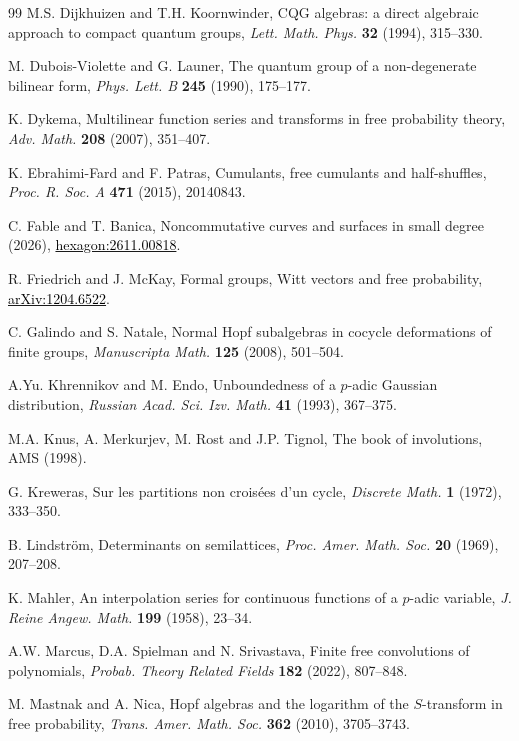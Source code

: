 \documentclass[11pt]{amsart}
\theoremstyle{definition}
\begin{document}
\begin{thebibliography}{99}
 M.S. Dijkhuizen and T.H. Koornwinder, CQG algebras: a direct algebraic approach to compact quantum groups, {\em Lett. Math. Phys.} {\bf 32} (1994), 315--330.

 M. Dubois-Violette and G. Launer, The quantum group of a non-degenerate bilinear form, {\em Phys. Lett. B} {\bf 245} (1990), 175--177.

 K. Dykema, Multilinear function series and transforms in free probability theory, {\em Adv. Math.} {\bf 208} (2007), 351--407.

 K. Ebrahimi-Fard and F. Patras, Cumulants, free cumulants and half-shuffles, {\em Proc. R. Soc. A} {\bf 471} (2015), 20140843.

 C. Fable and T. Banica, Noncommutative curves and surfaces in small degree (2026), \href{https://hexagonmath.org/2611.00818v1}{\textcolor{black}{\mbox{hexagon:2611.00818}}}.

 R. Friedrich and J. McKay, Formal groups, Witt vectors and free probability, \href{https://arxiv.org/pdf/1204.6522}{\textcolor{black}{\mbox{arXiv:1204.6522}}}.

 C. Galindo and S. Natale, Normal Hopf subalgebras in cocycle deformations of finite groups, {\em Manuscripta Math.} {\bf 125} (2008), 501--504.

 A.Yu. Khrennikov and M. Endo, Unboundedness of a $p$-adic Gaussian distribution, {\em Russian Acad. Sci. Izv. Math.} {\bf 41} (1993), 367--375.

 M.A. Knus, A. Merkurjev, M. Rost and J.P. Tignol, The book of involutions, AMS (1998).

 G. Kreweras, Sur les partitions non crois\'ees d'un cycle, {\em Discrete Math.} {\bf 1} (1972), 333--350.

 B. Lindstr\"om, Determinants on semilattices, {\em Proc. Amer. Math. Soc.} {\bf 20} (1969), 207--208.

 K. Mahler, An interpolation series for continuous functions of a $p$-adic variable, {\em J. Reine Angew. Math.} {\bf 199} (1958), 23--34.

 A.W. Marcus, D.A. Spielman and N. Srivastava, Finite free convolutions of polynomials, {\em Probab. Theory Related Fields} {\bf 182} (2022), 807--848.

 M. Mastnak and A. Nica, Hopf algebras and the logarithm of the $S$-transform in free probability, {\em Trans. Amer. Math. Soc.} {\bf 362} (2010), 3705--3743.


\end{thebibliography}
\end{document}
